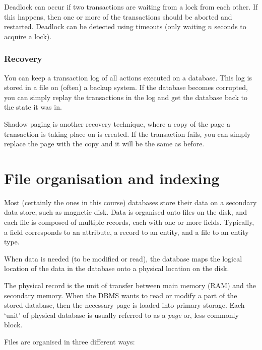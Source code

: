 Deadlock can occur if two transactions are waiting from a lock from each other.
If this happens, then one or more of the transactions should be aborted and
restarted. Deadlock can be detected using timeouts (only waiting $n$ seconds to
acquire a lock).

\subsubsection*{Recovery}

You can keep a transaction log of all actions executed on a database. This log
is stored in a file on (often) a backup system. If the database becomes
corrupted, you can simply replay the transactions in the log and get the
database back to the state it was in.

Shadow paging is another recovery technique, where a copy of the page a
transaction is taking place on is created. If the transaction fails, you can
simply replace the page with the copy and it will be the same as before.

\section{File organisation and indexing}

Most (certainly the ones in this course) databases store their data on a
secondary data store, such as magnetic disk. Data is organised onto files on the
disk, and each file is composed of multiple records, each with one or more
fields. Typically, a field corresponds to an attribute, a record to an entity,
and a file to an entity type.

When data is needed (to be modified or read), the database maps the logical
location of the data in the database onto a physical location on the disk.

The physical record is the unit of transfer between main memory (RAM) and the
secondary memory. When the DBMS wants to read or modify a part of the stored
database, then the necessary page is loaded into primary storage. Each `unit' of
physical database is usually referred to as a \textit{page} or, less commonly
block.

Files are organised in three different ways:

